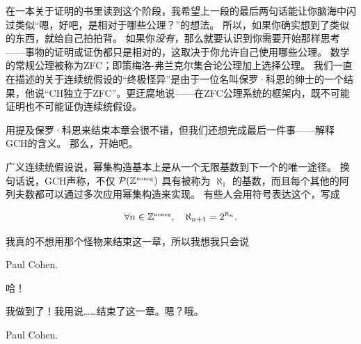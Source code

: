 在一本关于证明的书里读到这个阶段，我希望上一段的最后两句话能让你脑海中闪过类似“嗯，好吧，是相对于哪些公理？”的想法。
所以，如果你确实想到了类似的东西，就给自己拍拍背。
如果你\emph{没有}，那么就要认识到你需要开始那样思考——事物的证明或证伪都只是相对的，这取决于你允许自己使用哪些公理。
数学的常规公理被称为ZFC；即策梅洛-弗兰克尔集合论公理加上选择公理。
我们一直在描述的关于连续统假设的“终极怪异”是由于一位名叫保罗·科恩的绅士的一个结果，他说“CH独立于ZFC”。更迂腐地说——在ZFC公理系统的框架内，既不可能证明也不可能证伪连续统假设。

用提及保罗·科恩来结束本章会很不错，但我们还想完成最后一件事——解释GCH的含义。
那么，开始吧。

广义连续统假设说，幂集构造基本上是从一个无限基数到下一个的唯一途径。
换句话说，GCH声称，不仅 ${\mathcal P}({\mathbb Z}^{\mbox{\tiny noneg}})$ 具有被称为 $\aleph_1$ 的基数，而且每个其他的阿列夫数都可以通过多次应用幂集构造来实现。
有些人会用符号表达这个，写成

\[ \forall n \in {\mathbb Z}^{\mbox{\tiny noneg}}, \quad \aleph_{n+1} = 2^{\aleph_n}.
\]

我真的不想用那个怪物来结束这一章，所以我想我只会说

\centerline{Paul Cohen.}

哈！

我做到了！我用说……结束了这一章。嗯？哦。

\newpage

Paul Cohen.


